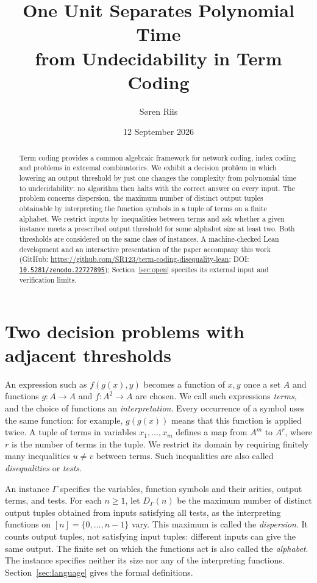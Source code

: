 \documentclass[12pt]{article}
\title{One Unit Separates Polynomial Time\\from Undecidability in Term Coding}
\author{S\o ren Riis}
\date{12 September 2026}
\theoremstyle{definition}
\newcommand{\PaperThreeLeanGitHub}{\url{https://github.com/SR123/term-coding-disequality-lean}}
\newcommand{\PaperThreeLeanDOI}{\href{https://doi.org/10.5281/zenodo.22727895}{\texttt{10.5281/zenodo.22727895}}}
\begin{document}
\maketitle
\begin{abstract}
Term coding provides a common algebraic framework for network coding,
index coding and problems in extremal combinatorics. We exhibit a
decision problem in which lowering an output threshold by just one
changes the complexity from polynomial time to undecidability: no
algorithm then halts with the correct answer on every input.
The problem concerns dispersion, the maximum number of distinct output
tuples obtainable by interpreting the function symbols in a tuple of
terms on a finite alphabet. We restrict inputs by inequalities between
terms and ask whether a given instance meets a prescribed output
threshold for some alphabet size at least two. Both thresholds are
considered on the same class of instances.
A machine-checked Lean development and an interactive presentation of
the paper accompany this work
(GitHub: \PaperThreeLeanGitHub; DOI: \PaperThreeLeanDOI);
Section~\ref{sec:open} specifies its external input and verification limits.
\end{abstract}

\section{Two decision problems with adjacent thresholds}
An expression such as $f(g(x),y)$ becomes a function of $x,y$ once a set
$A$ and functions $g:A\to A$ and $f:A^2\to A$ are chosen. We call such
expressions \emph{terms}, and the choice of functions an
\emph{interpretation}. Every occurrence of a symbol uses the same
function: for example, $g(g(x))$ means that this function is applied
twice. A tuple of terms in variables $x_1,\ldots,x_m$ defines a map
from $A^m$ to $A^r$, where $r$ is the number of terms in the tuple.
We restrict its domain by requiring finitely many inequalities
$u\ne v$ between terms. Such inequalities are also called
\emph{disequalities} or \emph{tests}.

An instance $\Gamma$ specifies the variables, function symbols and their
arities, output terms, and tests. For each $n\ge1$, let $D_\Gamma(n)$
be the maximum number of distinct output tuples obtained from inputs
satisfying all tests, as the interpreting functions on
$[n]=\{0,\ldots,n-1\}$ vary. This maximum is called the
\emph{dispersion}. It counts output tuples, not satisfying input tuples:
different inputs can give the same output. The finite set on which the
functions act is also called the \emph{alphabet}. The instance specifies
neither its size nor any of the interpreting functions.
Section~\ref{sec:language} gives the formal definitions.
\end{document}
